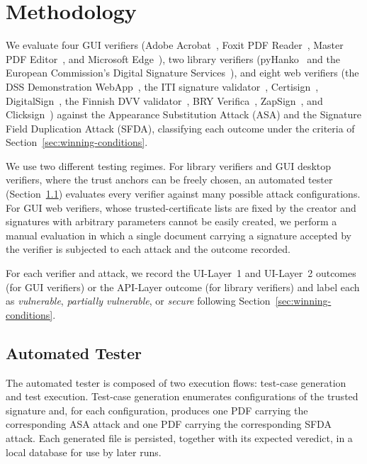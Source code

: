 \documentclass[12pt]{article}
\begin{document}
\section{Methodology}

We evaluate four GUI verifiers (Adobe Acrobat~\cite{adobereader}, Foxit PDF Reader~\cite{foxitreader}, Master PDF Editor~\cite{masterpdfeditor}, and Microsoft Edge~\cite{microsoftedge}), two library verifiers (pyHanko~\cite{pyhanko} and the European Commission's Digital Signature Services~\cite{eudss}), and eight web verifiers (the DSS Demonstration WebApp~\cite{dssdemo}, the ITI signature validator~\cite{itivalidador}, Certisign~\cite{certisign}, DigitalSign~\cite{digitalsign}, the Finnish DVV validator~\cite{dvv}, BRY Verifica~\cite{bry}, ZapSign~\cite{zapsign}, and Clicksign~\cite{clicksign}) against the Appearance Substitution Attack (ASA) and the Signature Field Duplication Attack (SFDA), classifying each outcome under the criteria of Section~\ref{sec:winning-conditions}.

We use two different testing regimes. For library verifiers and GUI desktop verifiers, where the trust anchors can be freely chosen, an automated tester (Section~\ref{sec:automated-tester}) evaluates every verifier against many possible attack configurations. For GUI web verifiers, whose trusted-certificate lists are fixed by the creator and signatures with arbitrary parameters cannot be easily created, we perform a manual evaluation in which a single document carrying a signature accepted by the verifier is subjected to each attack and the outcome recorded.

For each verifier and attack, we record the UI-Layer~1 and UI-Layer~2 outcomes (for GUI verifiers) or the API-Layer outcome (for library verifiers) and label each as \emph{vulnerable}, \emph{partially vulnerable}, or \emph{secure} following Section~\ref{sec:winning-conditions}.


\subsection{Automated Tester} \label{sec:automated-tester}

The automated tester is composed of two execution flows: test-case generation and test execution. Test-case generation enumerates configurations of the trusted signature and, for each configuration, produces one PDF carrying the corresponding ASA attack and one PDF carrying the corresponding SFDA attack. Each generated file is persisted, together with its expected veredict, in a local database for use by later runs.
\end{document}
